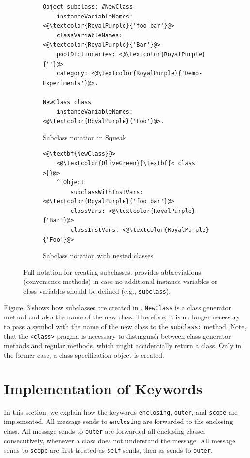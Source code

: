 \begin{figure}[!htp]
\begin{subfigure}[b]{\textwidth}
\begin{lstlisting}
Object subclass: #NewClass
    instanceVariableNames: <@\textcolor{RoyalPurple}{'foo bar'}@>
    classVariableNames: <@\textcolor{RoyalPurple}{'Bar'}@>
    poolDictionaries: <@\textcolor{RoyalPurple}{''}@>
    category: <@\textcolor{RoyalPurple}{'Demo-Experiments'}@>.

NewClass class
	instanceVariableNames: <@\textcolor{RoyalPurple}{'Foo'}@>.
\end{lstlisting}
\caption{Subclass notation in Squeak}
\label{fig:impl_subclass_squeak}
\end{subfigure}

\vspace{15pt}

\begin{subfigure}[b]{\textwidth}
\begin{lstlisting}
<@\textbf{NewClass}@>
    <@\textcolor{OliveGreen}{\textbf{< class >}}@>
    ^ Object 
        subclassWithInstVars: <@\textcolor{RoyalPurple}{'foo bar'}@>
        classVars: <@\textcolor{RoyalPurple}{'Bar'}@>
        classInstVars: <@\textcolor{RoyalPurple}{'Foo'}@>
\end{lstlisting}
\caption{Subclass notation with nested classes}
\label{fig:impl_subclass_nested}
\end{subfigure}
\caption[Notation for creating subclasses]{Full notation for creating subclasses. \msname provides abbreviations (convenience methods) in case no additional instance variables or class variables should be defined (e.g., \texttt{subclass}).}
\end{figure}

Figure~\ref{fig:impl_subclass_nested} shows how subclasses are created in \msname. \texttt{NewClass} is a class generator method and also the name of the new class. Therefore, it is no longer necessary to pass a symbol with the name of the new class to the \texttt{subclass:} method. Note, that the \texttt{<class>} pragma is necessary to distinguish between class generator methods and regular methods, which might accidentially return a class. Only in the former case, a class specification object is created.

\section{Implementation of Keywords}
\label{sec:impl_keywords}
In this section, we explain how the keywords \texttt{enclosing}, \texttt{outer}, and \texttt{scope} are implemented. All message sends to \texttt{enclosing} are forwarded to the enclosing class. All message sends to \texttt{outer} are forwarded all enclosing classes consecutively, whenever a class does not understand the message. All message sends to \texttt{scope} are first treated as \texttt{self} sends, then as sends to \texttt{outer}.

